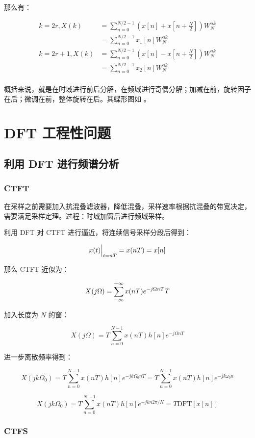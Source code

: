 \documentclass[cn,11pt,chinese,black,simple]{elegantbook}
\begin{document}
那么有： 

\[\begin{aligned}
    k = 2r, X(k) &= \sum_{n=0}^{N/2-1} (x[n] + x[n+\frac{N}{2}] ) W_N^{nk} \\ 
    &= \sum_{n=0}^{N/2-1} x_1[n] W_N^{nk} \\ 
    k = 2r+1, X(k) &= \sum_{n=0}^{N/2-1} (x[n] - x[n+\frac{N}{2}] ) W_N^{nk} \\ 
    &= \sum_{n=0}^{N/2-1} x_2[n] W_N^{nk} \\ 
\end{aligned}\]


概括来说，就是在时域进行前后分解，在频域进行奇偶分解；加减在前，旋转因子在后；微调在前，整体旋转在后。其蝶形图如  。



\section{DFT 工程性问题}

\subsection{利用 DFT 进行频谱分析}

\subsubsection{CTFT}

在采样之前需要加入抗混叠滤波器，降低混叠，采样速率根据抗混叠的带宽决定，需要满足采样定理。过程：时域加窗后进行频域采样。

利用 DFT 对 CTFT 进行逼近，将连续信号采样分段后得到：

\[x(t)\Big|_{t=nT} = x(nT) = x[n]\]

那么 CTFT 近似为：

\[X(j\Omega) = \sum_{-\infty}^{+\infty} x(n T) e^{-j\Omega n T} T \]

加入长度为 \(N\) 的窗：

\[X(j\Omega) =  T \sum_{n = 0}^{N-1} x(n T) h[n] e^{-j\Omega n T} \]

进一步离散频率得到：

\[X(jk \Omega_0) =  T \sum_{n = 0}^{N-1} x(n T) h[n] e^{-jk \Omega_0 n T} = T \sum_{n = 0}^{N-1} x(n T) h[n] e^{-jk \omega_0 n} \]

\[X(jk \Omega_0)= T \sum_{n = 0}^{N-1} x(n T) h[n] e^{-jkn 2\pi / N}= T \text{DFT}[x[n]]\]

\subsubsection{CTFS}
\end{document}
